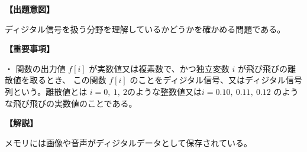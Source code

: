 \noindent \textbf{【出題意図】}

\noindent ディジタル信号を扱う分野を理解しているかどうかを確かめる問題である。

\vspace{1em}
\noindent \textbf{【重要事項】}

\medskip
\noindent ・ 関数の出力値 $f[i]$ が実数値又は複素数で、かつ独立変数 $i$ が飛び飛びの離散値を取るとき、 この関数 $f[i]$ のことをディジタル信号、又はディジタル信号列という。離散値とは $i=0,\ 1,\ 2$のような整数値又は$i=0.10,\ 0.11,\ 0.12$ のような飛び飛びの実数値のことである。

\vspace{1em}
\noindent \textbf{【解説】}

\noindent メモリには画像や音声がディジタルデータとして保存されている。
